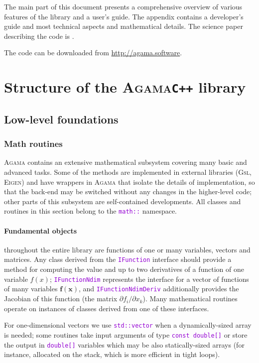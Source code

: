 \documentclass[12pt]{article}
\newcommand{\Agama}{\textsc{Agama}\xspace}
\newcommand{\Gsl}  {\textsc{Gsl}\xspace}
\newcommand{\Eigen}{\textsc{Eigen}\xspace}
\newcommand{\Cpp}  {\texttt{C++}\xspace}
\newcommand{\ttt}[1]{\textcolor{darkviolet}{\texttt{#1}}}
\newcommand{\D}{\partial}
\newcommand{\bx}{\boldsymbol{x}}
\let\oldparagraph\paragraph
\renewcommand{\paragraph}[1]{\vspace{-2mm}\oldparagraph{#1}}
\begin{document}
The main part of this document presents a comprehensive overview of various features of the library and a user's guide. The appendix contains a developer's guide and most technical aspects and mathematical details. The science paper describing the code is \cite{Vasiliev2019}.

The code can be downloaded from \url{http://agama.software}.


\section{Structure of the \Agama \Cpp library}  \label{sec:Structure}

\subsection{Low-level foundations}

\subsubsection{Math routines}  \label{sec:Math}
\Agama contains an extensive mathematical subsystem covering many basic and advanced tasks. Some of the methods are implemented in external libraries (\Gsl, \Eigen) and have wrappers in \Agama that isolate the details of implementation, so that the back-end may be switched without any changes in the higher-level code; other parts of this subsystem are self-contained developments.
All classes and routines in this section belong to the \ttt{math::} namespace.

\paragraph{Fundamental objects}
throughout the entire library are functions of one or many variables, vectors and matrices.
Any class derived from the \ttt{IFunction} interface should provide a method for computing the value and up to two derivatives of a function of one variable $f(x)$; \ttt{IFunctionNdim} represents the interface for a vector of functions of many variables $\boldsymbol{f}(\bx)$, and \ttt{IFunctionNdimDeriv} additionally provides the Jacobian of this function (the matrix $\D f_i /\D x_k$). Many mathematical routines operate on instances of classes derived from one of these interfaces.

For one-dimensional vectors we use \ttt{std::vector} when a dynamically-sized array is needed; some routines take input arguments of type \ttt{const double[]} or store the output in \ttt{double[]} variables which may be also statically-sized arrays (for instance, allocated on the stack, which is more efficient in tight loops).
\end{document}
